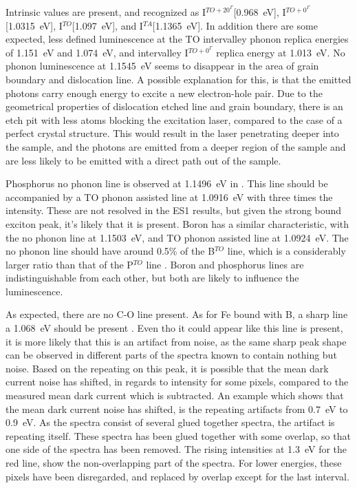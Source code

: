 Intrinsic values are present, and recognized as I$^{TO+20^\Gamma}$[0.968~eV], I$^{TO+0^\Gamma}$[1.0315~eV], I$^{TO}$[1.097~eV], and I$^{TA}$[1.1365~eV]. In addition there are some expected, less defined luminescence at the TO intervalley phonon replica energies of 1.151~eV and 1.074~eV, and intervalley I$^{TO+0^\Gamma}$ replica energy at 1.013~eV. No phonon luminescence at 1.1545~eV seems to disappear in the area of grain boundary and dislocation line. A possible explanation for this, is that the emitted photons carry enough energy to excite a new electron-hole pair. Due to the geometrical properties of dislocation etched line and grain boundary, there is an etch pit with less atoms blocking the excitation laser, compared to the case of a perfect crystal structure. This would result in the laser penetrating deeper into the sample, and the photons are emitted from a deeper region of the sample and are less likely to be emitted with a direct path out of the sample.


Phosphorus no phonon line is observed at 1.1496~eV in \cite{dean67}. This line should be accompanied by a TO phonon assisted line at 1.0916~eV with three times the intensity. These are not resolved in the ES1 results, but given the strong bound exciton peak, it's likely that it is present. Boron has a similar characteristic, with the no phonon line at 1.1503~eV, and TO phonon assisted line at 1.0924~eV. The no phonon line should have around 0.5\% of the B$^{TO}$ line, which is a considerably larger ratio than that of the P$^{TO}$ line \cite{dean67}. Boron and phosphorus lines are indistinguishable from each other, but both are likely to influence the luminescence. 


As expected, there are no C-O line present. As for Fe bound with B, a sharp line a 1.068~eV should be present \cite{mohring83}. Even tho it could appear like this line is present, it is more likely that this is an artifact from noise, as the same sharp peak shape can be observed in different parts of the spectra known to contain nothing but noise. Based on the repeating on this peak, it is possible that the mean dark current noise has shifted, in regards to intensity for some pixels, compared to the measured mean dark current which is subtracted. An example which shows that the mean dark current noise has shifted, is the repeating artifacts from 0.7~eV to 0.9~eV. As the spectra consist of several glued together spectra, the artifact is repeating itself. These spectra has been glued together with some overlap, so that one side of the spectra has been removed. The rising intensities at 1.3~eV for the red line, show the non-overlapping part of the spectra. For lower energies, these pixels have been disregarded, and replaced by overlap except for the last interval.








